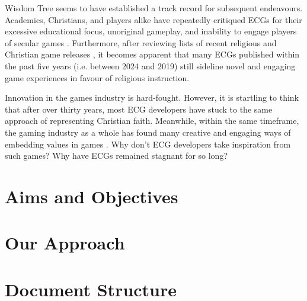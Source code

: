 Wisdom Tree seems to have established a track record for subsequent endeavours. Academics, Christians, and players alike have repeatedly critiqued \acp{ECG} for their excessive educational focus, unoriginal gameplay, and inability to engage players of secular games \parencite{bogost_persuasive_2007, schut_making_2013, moon_channel_why_2023, innocentbystander_why_2009}. Furthermore, after reviewing lists of recent religious and Christian game releases \parencite{gonzalez_religious_2022, noauthor_list_2024}, it becomes apparent that many \acp{ECG} published within the past five years (i.e. between 2024 and 2019) still sideline novel and engaging game experiences in favour of religious instruction.%









Innovation in the games industry is hard-fought. However, it is startling to think that after over thirty years, most \ac{ECG} developers have stuck to the same approach of representing Christian faith. Meanwhile, within the same timeframe, the gaming industry as a whole has found many creative and engaging ways of embedding values in games \parencite{bogost_persuasive_2007, flanagan_values_2014}. Why don't \ac{ECG} developers take inspiration from such games? Why have \acp{ECG} remained stagnant for so long?

\section{Aims and Objectives} 
\blindtext

\section{Our Approach} 
\blindtext

\section{Document Structure}
\blindtext
